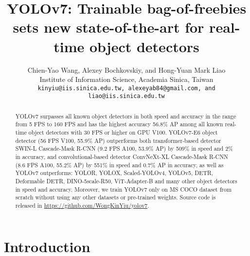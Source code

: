 \documentclass[10pt,twocolumn,letterpaper]{article}
\begin{document}
	
\title{YOLOv7: Trainable bag-of-freebies sets new state-of-the-art for real-time object detectors}
		
		\author{
			Chien-Yao Wang, Alexey Bochkovskiy, and Hong-Yuan Mark Liao \\
			Institute of Information Science, Academia Sinica, Taiwan \\	{\tt\small kinyiu@iis.sinica.edu.tw, alexeyab84@gmail.com, and liao@iis.sinica.edu.tw}
			\vspace{-4mm}
}
		
		\maketitle


\begin{abstract}
			


			\vspace{-2mm}
			YOLOv7 surpasses all known object detectors in both speed and accuracy in the range from 5 FPS to 160 FPS and has the highest accuracy 56.8\% AP among all known real-time object detectors with 30 FPS or higher on GPU V100. YOLOv7-E6 object detector (56 FPS V100, 55.9\% AP) outperforms both transformer-based detector SWIN-L Cascade-Mask R-CNN (9.2 FPS A100, 53.9\% AP) by 509\% in speed and 2\% in accuracy, and convolutional-based detector ConvNeXt-XL Cascade-Mask R-CNN (8.6 FPS A100, 55.2\% AP) by 551\% in speed and 0.7\% AP in accuracy, as well as YOLOv7 outperforms: YOLOR, YOLOX, Scaled-YOLOv4, YOLOv5, DETR, Deformable DETR, DINO-5scale-R50, ViT-Adapter-B and many other object detectors in speed and accuracy. Moreover, we train YOLOv7 only on MS COCO dataset from scratch without using any other datasets or pre-trained weights. Source code is released in \url{https://github.com/WongKinYiu/yolov7}.
			\vspace{-8mm}
		\end{abstract}
		
\section{Introduction}
		\label{sec:intr}
				
\end{document}
